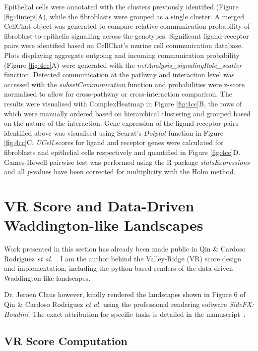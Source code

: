 Epithelial cells were annotated with the clusters previously identified (Figure \ref{fig:4intepi}A), while the fibroblasts were grouped as a single cluster. A merged CellChat object was generated to compare relative communication probability of fibroblast-to-epithelia signalling across the genotypes. Significant ligand-receptor pairs were identified based on CellChat's murine cell communication database. Plots displaying aggregate outgoing and incoming communication probability (Figure \ref{fig:4cc}A) were generated with the \textit{netAnalysis\_signalingRole\_scatter} function. Detected communication at the pathway and interaction level was accessed with the \textit{subsetCommunication} function and probabilities were z-score normalised to allow for cross-pathway or cross-interaction comparison. The results were visualised with ComplexHeatmap in Figure \ref{fig:4cc}B, the rows of which were manually ordered based on hierarchical clustering and grouped based on the nature of the interaction. Gene expression of the ligand-receptor pairs identified above was visualised using Seurat's \textit{Dotplot} function in Figure \ref{fig:4cc}C. \textit{UCell} scores for ligand and receptor genes were calculated for fibroblasts and epithelial cells respectively and quantified in Figure \ref{fig:4cc}D. Games-Howell pairwise test was performed using the R package \textit{statsExpressions} and all \textit{p}-values have been corrected for multiplicity with the Holm method.

\newpage
\section{VR Score and Data-Driven Waddington-like Landscapes}

Work presented in this section has already been made public in Qin \& Cardoso Rodriguez \emph{et al.}~\cite{cardoso_rodriguez_single-cell_2023}. I am the author behind the Valley-Ridge (VR) score design and implementation, including the python-based renders of the data-driven Waddington-like landscapes. 

Dr. Jeroen Claus however, kindly rendered the landscapes shown in Figure 6 of Qin \& Cardoso Rodriguez \emph{et al.} using the professional rendering software \emph{SideFX: Houdini}. The exact attribution for specific tasks is detailed in the manuscript~\cite{cardoso_rodriguez_single-cell_2023}.

\subsection{VR Score Computation}

